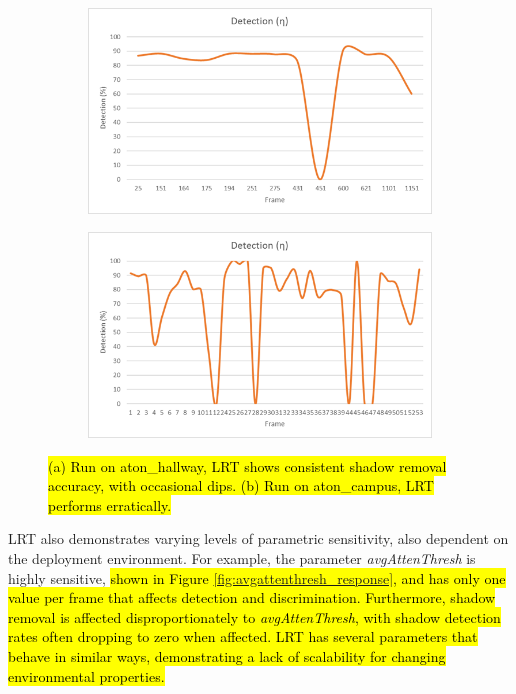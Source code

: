 \begin{figure}
\centering
\begin{subfigure}{.8\linewidth}
  \centering
  \includegraphics[width=1\linewidth]{figures/lrt_sensitivity_2.jpg}
  \caption{}
\end{subfigure}
\hfill
\begin{subfigure}{.8\linewidth}
  \centering
  \includegraphics[width=1\linewidth]{figures/lrt_sensitivity_1.jpg}
  \caption{}
\end{subfigure}
\caption{\hl{(a) Run on aton\_hallway, LRT shows consistent shadow removal accuracy, with occasional dips. (b) Run on aton\_campus, LRT performs erratically.}}
\label{fig:lrt_sensitivity}
\end{figure}

LRT also demonstrates varying levels of parametric sensitivity, also dependent on the deployment environment. For example, the parameter \textit{avgAttenThresh} is highly sensitive, \hl{shown in Figure \ref{fig:avgattenthresh_response}, and has only one value per frame that affects detection and discrimination. Furthermore, shadow removal is affected disproportionately to \textit{avgAttenThresh}, with shadow detection rates often dropping to zero when affected. LRT has several parameters that behave in similar ways, demonstrating a lack of scalability for changing environmental properties.}

